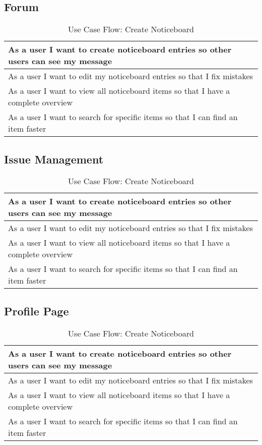 \subsection{Forum}
\begin{table}[H]
  \begin{tabularx}{\linewidth}{|X|}
    \hline
      As a user I want to create noticeboard entries so other users can see my message \\
     \hline
      As a user I want to edit my noticeboard entries so that I fix mistakes \\
     \hline
      As a user I want to view all noticeboard items so that I have a complete overview \\
     \hline
      As a user I want to search for specific items so that I can find an item faster \\
     \hline 
  \end{tabularx}
  \caption{Use Case Flow: Create Noticeboard}
\end{table}

\subsection{Issue Management}
\begin{table}[H]
  \begin{tabularx}{\linewidth}{|X|}
    \hline
      As a user I want to create noticeboard entries so other users can see my message \\
     \hline
      As a user I want to edit my noticeboard entries so that I fix mistakes \\
     \hline
      As a user I want to view all noticeboard items so that I have a complete overview \\
     \hline
      As a user I want to search for specific items so that I can find an item faster \\
     \hline 
  \end{tabularx}
  \caption{Use Case Flow: Create Noticeboard}
\end{table}

\subsection{Profile Page}
\begin{table}[H]
  \begin{tabularx}{\linewidth}{|X|}
    \hline
      As a user I want to create noticeboard entries so other users can see my message \\
     \hline
      As a user I want to edit my noticeboard entries so that I fix mistakes \\
     \hline
      As a user I want to view all noticeboard items so that I have a complete overview \\
     \hline
      As a user I want to search for specific items so that I can find an item faster \\
     \hline 
  \end{tabularx}
  \caption{Use Case Flow: Create Noticeboard}
\end{table}

